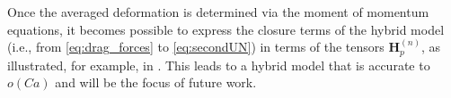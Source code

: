 
Once the averaged deformation is determined via the moment of momentum equations, it becomes possible to express the closure terms of the hybrid model (i.e., from \ref{eq:drag_forces} to \ref{eq:secondUN}) in terms of the tensors $\textbf{H}_p^{(n)}$, as illustrated, for example, in \citet{haber1971dynamics}. 
This leads to a hybrid model that is accurate to $o(Ca)$ and will be the focus of future work.


